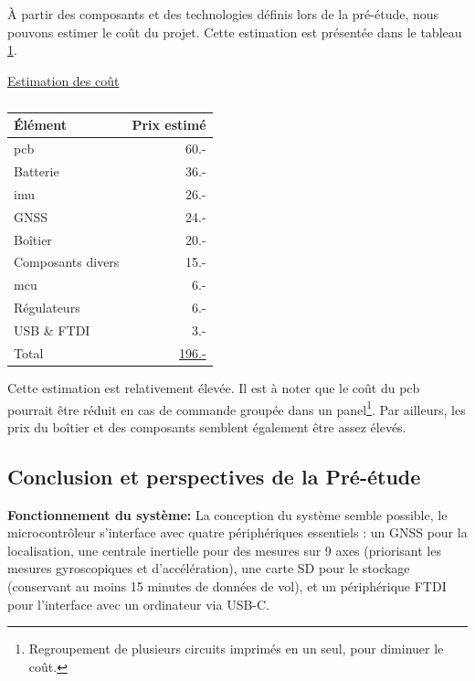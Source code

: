 À partir des composants et des technologies définis lors de la pré-étude, nous pouvons estimer le coût du projet. Cette estimation est présentée dans le tableau \ref{tab:estimcouts}.

\begin{center}
	\underline{Estimation des coût} 
	\vspace{-4mm}
	\begin{table}[h]
		\centering
		\begin{tabular}{lr}
			Élément & Prix estimé \\
			\hline
			\gls{pcb} & 60.- \\
			Batterie & 36.- \\
			\gls{imu} & 26.- \\
			\gls{GNSS} & 24.- \\
			Boîtier & 20.- \\
			Composants divers & 15.- \\
			\gls{mcu} & 6.- \\
			Régulateurs & 6.- \\
			USB \& \gls{FTDI} & 3.- \\
			\hline
			Total & \underline{196.-} \\
			\hline
		\end{tabular}
		\caption{}
		\label{tab:estimcouts}
	\end{table}
\end{center} \vspace{-5mm}

Cette estimation est relativement élevée. Il est à noter que le coût du \gls{pcb} pourrait être réduit en cas de commande groupée dans un panel\footnote{Regroupement de plusieurs circuits imprimés en un seul, pour diminuer le coût.}. Par ailleurs, les prix du boîtier et des composants semblent également être assez élevés.


\subsection{Conclusion et perspectives de la Pré-étude}

\textbf{Fonctionnement du système:}
La conception du système semble possible, le microcontrôleur s'interface avec quatre périphériques essentiels : un \gls{GNSS} pour la localisation, une centrale inertielle pour des mesures sur 9 axes (priorisant les mesures gyroscopiques et d'accélération), une carte SD pour le stockage (conservant au moins 15 minutes de données de vol), et un périphérique \gls{FTDI} pour l'interface avec un ordinateur via USB-C.

